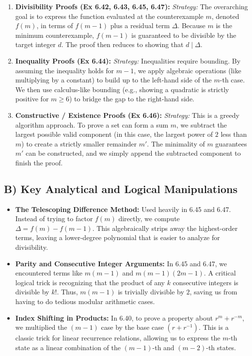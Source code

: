 \documentclass[11pt, a4paper]{article}
\theoremstyle{definition}
\theoremstyle{remark}
\begin{document}
\begin{enumerate}
    \item \textbf{Divisibility Proofs (Ex 6.42, 6.43, 6.45, 6.47):} 
    \textit{Strategy:} The overarching goal is to express the function evaluated at the counterexample $m$, denoted $f(m)$, in terms of $f(m-1)$ plus a residual term $\Delta$. Because $m$ is the minimum counterexample, $f(m-1)$ is guaranteed to be divisible by the target integer $d$. The proof then reduces to showing that $d \mid \Delta$. 
    \item \textbf{Inequality Proofs (Ex 6.44):}
    \textit{Strategy:} Inequalities require bounding. By assuming the inequality holds for $m-1$, we apply algebraic operations (like multiplying by a constant) to build up to the left-hand side of the $m$-th case. We then use calculus-like bounding (e.g., showing a quadratic is strictly positive for $m \ge 6$) to bridge the gap to the right-hand side.
    \item \textbf{Constructive / Existence Proofs (Ex 6.46):}
    \textit{Strategy:} This is a greedy algorithm approach. To prove a set can form a sum $m$, we subtract the largest possible valid component (in this case, the largest power of $2$ less than $m$) to create a strictly smaller remainder $m'$. The minimality of $m$ guarantees $m'$ can be constructed, and we simply append the subtracted component to finish the proof.
\end{enumerate}

\subsection{B) Key Analytical and Logical Manipulations}
\begin{itemize}
    \item \textbf{The Telescoping Difference Method:} Used heavily in 6.45 and 6.47. Instead of trying to factor $f(m)$ directly, we compute $\Delta = f(m) - f(m-1)$. This algebraically strips away the highest-order terms, leaving a lower-degree polynomial that is easier to analyze for divisibility.
    \item \textbf{Parity and Consecutive Integer Arguments:} In 6.45 and 6.47, we encountered terms like $m(m-1)$ and $m(m-1)(2m-1)$. A critical logical trick is recognizing that the product of any $k$ consecutive integers is divisible by $k!$. Thus, $m(m-1)$ is trivially divisible by $2$, saving us from having to do tedious modular arithmetic cases.
    \item \textbf{Index Shifting in Products:} In 6.40, to prove a property about $r^m + r^{-m}$, we multiplied the $(m-1)$ case by the base case $(r + r^{-1})$. This is a classic trick for linear recurrence relations, allowing us to express the $m$-th state as a linear combination of the $(m-1)$-th and $(m-2)$-th states.
\end{itemize}
\end{document}
